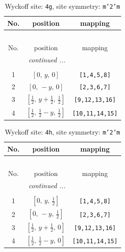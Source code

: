 \documentclass[fleqn,8pt]{jsarticle}
\begin{document}
\renewcommand{\arraystretch}{1.2}
\begin{longtable}{ccc}
\caption{Wyckoff site: {\tt 4g}, site symmetry: {\tt m'2'm}}
 \\
 \hline \hline
No. & position & mapping \\ \hline \endfirsthead

\multicolumn{2}{l}{\tablename\ \thetable{}} \\
 \hline \hline
No. & position & mapping \\ \hline \endhead

 \hline \hline
\multicolumn{2}{r}{\footnotesize\it continued ...} \\ \endfoot

 \hline \hline
\multicolumn{2}{r}{} \\ \endlastfoot

1 & $\left[ 0,\, y,\, 0 \right]$ & {\tt [1,4,5,8]} \\ \hline
2 & $\left[ 0,\, - y,\, 0 \right]$ & {\tt [2,3,6,7]} \\ \hline
3 & $\left[ \frac{1}{2},\, y + \frac{1}{2},\, \frac{1}{2} \right]$ & {\tt [9,12,13,16]} \\ \hline
4 & $\left[ \frac{1}{2},\, \frac{1}{2} - y,\, \frac{1}{2} \right]$ & {\tt [10,11,14,15]} \\
\end{longtable}
\renewcommand{\arraystretch}{1.2}
\begin{longtable}{ccc}
\caption{Wyckoff site: {\tt 4h}, site symmetry: {\tt m'2'm}}
 \\
 \hline \hline
No. & position & mapping \\ \hline \endfirsthead

\multicolumn{2}{l}{\tablename\ \thetable{}} \\
 \hline \hline
No. & position & mapping \\ \hline \endhead

 \hline \hline
\multicolumn{2}{r}{\footnotesize\it continued ...} \\ \endfoot

 \hline \hline
\multicolumn{2}{r}{} \\ \endlastfoot

1 & $\left[ 0,\, y,\, \frac{1}{2} \right]$ & {\tt [1,4,5,8]} \\ \hline
2 & $\left[ 0,\, - y,\, \frac{1}{2} \right]$ & {\tt [2,3,6,7]} \\ \hline
3 & $\left[ \frac{1}{2},\, y + \frac{1}{2},\, 0 \right]$ & {\tt [9,12,13,16]} \\ \hline
4 & $\left[ \frac{1}{2},\, \frac{1}{2} - y,\, 0 \right]$ & {\tt [10,11,14,15]} \\
\end{longtable}
\end{document}
